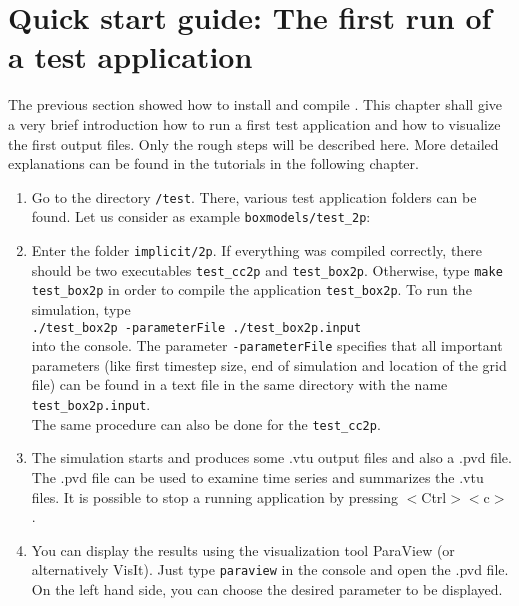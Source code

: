 \section[Quick start guide]{Quick start guide: The first run of a test application}\label{quick-start-guide}

The previous section showed how to install and compile \Dumux. This chapter shall give a very brief introduction how to run a first test application and how to visualize the first output files. Only the rough steps will be described here. More detailed explanations can be found in the tutorials in the following chapter.

\begin{enumerate}
 \item Go to the directory \texttt{/test}. There, various test application folders can be found. Let us consider as example \texttt{boxmodels/test{\_}2p}:
 \item Enter the folder \texttt{implicit/2p}. If everything was compiled correctly, there should be two executables \texttt{test{\_}cc2p} and \texttt{test{\_}box2p}. Otherwise, type \texttt{make test{\_}box2p} in order to compile the application \texttt{test{\_}box2p}. To run the simulation, type\\ 
 \texttt{./test{\_}box2p -parameterFile ./test\_box2p.input}\\
 into the console. The parameter \texttt{-parameterFile} specifies that all important parameters (like first timestep size, end of simulation and location of the grid file) can be found in a text file in the same directory  with the name \texttt{test\_box2p.input}.\\
 The same procedure can also be done for the \texttt{test{\_}cc2p}.
 \item The simulation starts and produces some .vtu output files and also a .pvd file. The .pvd file can be used to examine time series and summarizes the .vtu files. It is possible to stop a running application by pressing $<$Ctrl$><$c$>$.
 \item You can display the results using the visualization tool ParaView (or alternatively VisIt). Just type \texttt{paraview} in the console and open the .pvd file. On the left hand side, you can choose the desired parameter to be displayed.
\end{enumerate}
